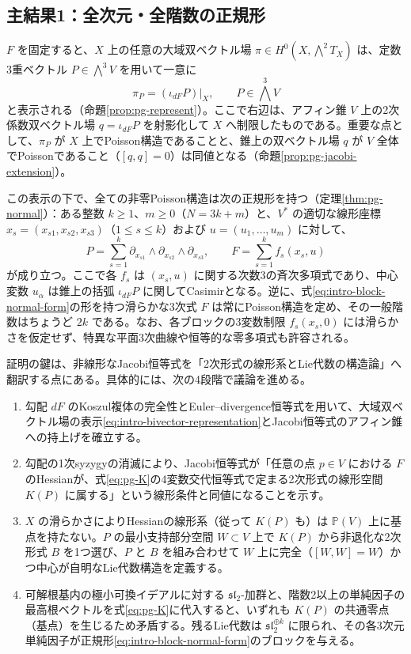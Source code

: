 \subsection*{主結果1：全次元・全階数の正規形}
$F$ を固定すると、$X$ 上の任意の大域双ベクトル場 $\pi\in H^0(X,\bigwedge^2T_X)$ は、定数3重ベクトル $P\in\bigwedge^3V$ を用いて一意に
\begin{equation}\label{eq:intro-bivector-representation}
\pi_P=(\iota_{dF}P)|_X,\qquad P\in\bigwedge^3V
\end{equation}
と表示される（命題\ref{prop:pg-represent}）。ここで右辺は、アフィン錐 $V$ 上の2次係数双ベクトル場 $q=\iota_{dF}P$ を射影化して $X$ へ制限したものである。重要な点として、$\pi_P$ が $X$ 上でPoisson構造であることと、錐上の双ベクトル場 $q$ が $V$ 全体でPoissonであること（$[q,q]=0$）は同値となる（命題\ref{prop:pg-jacobi-extension}）。

この表示の下で、全ての非零Poisson構造は次の正規形を持つ（定理\ref{thm:pg-normal}）：ある整数 $k\ge1$、$m\ge0$（$N=3k+m$）と、$V^*$ の適切な線形座標 $x_s=(x_{s1},x_{s2},x_{s3})$（$1\le s\le k$）および $u=(u_1,\ldots,u_m)$ に対して、
\begin{equation}\label{eq:intro-block-normal-form}
P=\sum_{s=1}^k\partial_{x_{s1}}\wedge\partial_{x_{s2}}\wedge\partial_{x_{s3}},
\qquad F=\sum_{s=1}^k f_s(x_s,u)
\end{equation}
が成り立つ。ここで各 $f_s$ は $(x_s,u)$ に関する次数3の斉次多項式であり、中心変数 $u_\alpha$ は錐上の括弧 $\iota_{dF}P$ に関してCasimirとなる。逆に、式\eqref{eq:intro-block-normal-form}の形を持つ滑らかな3次式 $F$ は常にPoisson構造を定め、その一般階数はちょうど $2k$ である。なお、各ブロックの3変数制限 $f_s(x_s,0)$ には滑らかさを仮定せず、特異な平面3次曲線や恒等的な零多項式も許容される。

証明の鍵は、非線形なJacobi恒等式を「2次形式の線形系とLie代数の構造論」へ翻訳する点にある。具体的には、次の4段階で議論を進める。
\begin{enumerate}
  \item 勾配 $dF$ のKoszul複体の完全性とEuler--divergence恒等式を用いて、大域双ベクトル場の表示\eqref{eq:intro-bivector-representation}とJacobi恒等式のアフィン錐への持上げを確立する。
  \item 勾配の1次syzygyの消滅により、Jacobi恒等式が「任意の点 $p\in V$ における $F$ のHessianが、式\eqref{eq:pg-K}の4変数交代恒等式で定まる2次形式の線形空間 $K(P)$ に属する」という線形条件と同値になることを示す。
  \item $X$ の滑らかさによりHessianの線形系（従って $K(P)$ も）は $\mathbb P(V)$ 上に基点を持たない。$P$ の最小支持部分空間 $W\subset V$ 上で $K(P)$ から非退化な2次形式 $B$ を1つ選び、$P$ と $B$ を組み合わせて $W$ 上に完全（$[W,W]=W$）かつ中心が自明なLie代数構造を定義する。
  \item 可解根基内の極小可換イデアルに対する $\mathfrak{sl}_2$-加群と、階数2以上の単純因子の最高根ベクトルを式\eqref{eq:pg-K}に代入すると、いずれも $K(P)$ の共通零点（基点）を生じるため矛盾する。残るLie代数は $\mathfrak{sl}_2^{\oplus k}$ に限られ、その各3次元単純因子が正規形\eqref{eq:intro-block-normal-form}のブロックを与える。
\end{enumerate}


